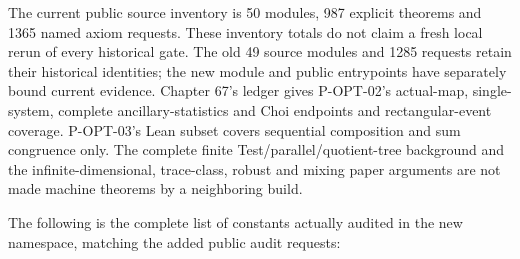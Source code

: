 \documentclass[
  11pt,
  oneside]{book}
\begin{document}
The current public source inventory is 50 modules, 987 explicit theorems
and 1365 named axiom requests. These inventory totals do not claim a
fresh local rerun of every historical gate. The old 49 source modules
and 1285 requests retain their historical identities; the new module and
public entrypoints have separately bound current evidence. Chapter 67's
ledger gives P-OPT-02's actual-map, single-system, complete
ancillary-statistics and Choi endpoints and rectangular-event coverage.
P-OPT-03's Lean subset covers sequential composition and sum congruence
only. The complete finite Test/parallel/quotient-tree background and the
infinite-dimensional, trace-class, robust and mixing paper arguments are
not made machine theorems by a neighboring build.

The following is the complete list of constants actually audited in the
new namespace, matching the added public audit requests:
\end{document}
